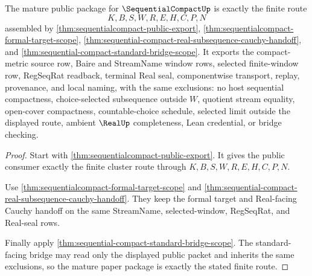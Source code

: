 \begin{theorem}
\label{thm:sequential-compact-mature-public-bridge-package}
The mature public package for $\SequentialCompactUp$ is exactly the finite route
$$
K,B,S,W,R,E,H,C,P,N
$$
assembled by \autoref{thm:sequentialcompact-public-export}, \autoref{thm:sequentialcompact-formal-target-scope}, \autoref{thm:sequential-compact-real-subsequence-cauchy-handoff}, and \autoref{thm:sequential-compact-standard-bridge-scope}. It exports the compact-metric source row, Baire and StreamName window rows, selected finite-window row, RegSeqRat readback, terminal Real seal, componentwise transport, replay, provenance, and local naming, with the same exclusions: no host sequential compactness, choice-selected subsequence outside $W$, quotient stream equality, open-cover compactness, countable-choice schedule, selected limit outside the displayed route, ambient $\RealUp$ completeness, Lean credential, or bridge checking.
\end{theorem}
\begin{proof}
Start with \autoref{thm:sequentialcompact-public-export}. It gives the public consumer exactly the finite cluster route through $K,B,S,W,R,E,H,C,P,N$.

Use \autoref{thm:sequentialcompact-formal-target-scope} and \autoref{thm:sequential-compact-real-subsequence-cauchy-handoff}. They keep the formal target and Real-facing Cauchy handoff on the same StreamName, selected-window, RegSeqRat, and Real-seal rows.

Finally apply \autoref{thm:sequential-compact-standard-bridge-scope}. The standard-facing bridge may read only the displayed public packet and inherits the same exclusions, so the mature paper package is exactly the stated finite route.
\end{proof}


